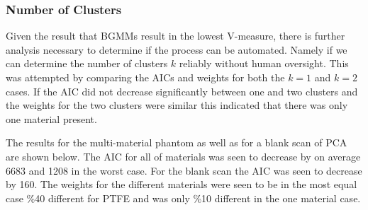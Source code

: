 \documentclass[a4paper,11pt]{article}
\begin{document}
\subsubsection{Number of Clusters}

Given the result that BGMMs result in the lowest V-measure, there is further analysis necessary to determine if the process can be automated. Namely if we can determine the number of clusters $k$ reliably without human oversight. This was attempted by comparing the AICs and weights for both the $k=1$ and $k=2$ cases. If the AIC did not decrease significantly between one and two clusters and the weights for the two clusters were similar this indicated that there was only one material present.

The results for the multi-material phantom as well as for a blank scan of PCA are shown below. The AIC for all of materials was seen to decrease by on average 6683 and 1208 in the worst case. For the blank scan the AIC was seen to decrease by 160. The weights for the different materials were seen to be in the most equal case \%40 different for PTFE and was only \%10 different in the one material case.
\end{document}

